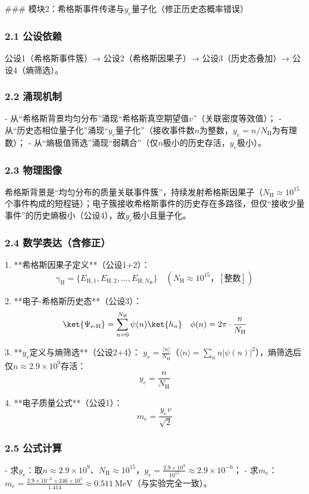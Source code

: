\documentclass{article}
\begin{document}
### 模块2：希格斯事件传递与\(y_e\)量子化（修正历史态概率错误）
\subsubsection{2.1 公设依赖}
公设1（希格斯事件簇）→ 公设2（希格斯因果子）→ 公设3（历史态叠加）→ 公设4（熵筛选）。

\subsubsection{2.2 涌现机制}
- 从“希格斯背景均匀分布”涌现“希格斯真空期望值\(v\)”（关联密度等效值）；  
- 从“历史态相位量子化”涌现“\(y_e\)量子化”（接收事件数\(n\)为整数，\(y_e=n/N_{\text{H}}\)为有理数）；  
- 从“熵极值筛选”涌现“弱耦合”（仅\(n\)极小的历史存活，\(y_e\)极小）。

\subsubsection{2.3 物理图像}
希格斯背景是“均匀分布的质量关联事件簇”，持续发射希格斯因果子（\(N_{\text{H}}≈10^{15}\)个事件构成的短程链）；电子簇接收希格斯事件的历史存在多路径，但仅“接收少量事件”的历史熵极小（公设4），故\(y_e\)极小且量子化。

\subsubsection{2.4 数学表达（含修正）}
1. **希格斯因果子定义**（公设1+2）：  
   \[
   \gamma_{\text{H}} = \{E_{\text{H},1}, E_{\text{H},2}, ..., E_{\text{H},N_{\text{H}}}\} \quad (N_{\text{H}}≈10^{15}，[\text{整数}])
   \]

2. **电子-希格斯历史态**（公设3）：  
   \[
   \ket{\Psi_{\text{e-H}}} = \sum_{n=0}^{N_{\text{H}}} \psi(n) \ket{h_n} \quad \phi(n) = 2\pi \cdot \frac{n}{N_{\text{H}}}
   \]

3. **\(y_e\)定义与熵筛选**（公设2+4）：  
   \(y_e = \frac{\langle n \rangle}{N_{\text{H}}}\)（\(\langle n \rangle = \sum_n n |\psi(n)|^2\)），熵筛选后仅\(n≈2.9×10^9\)存活：  
   \[
   y_e = \frac{n}{N_{\text{H}}}
   \]

4. **电子质量公式**（公设1）：  
   \[
   m_e = \frac{y_e v}{\sqrt{2}}
   \]

\subsubsection{2.5 公式计算}
- 求\(y_e\)：取\(n≈2.9×10^9\)、\(N_{\text{H}}≈10^{15}\)，\(y_e = \frac{2.9×10^9}{10^{15}} ≈ 2.9×10^{-6}\)；  
- 求\(m_e\)：\(m_e = \frac{2.9×10^{-6}×246×10^3}{1.414} ≈ 0.511\ \text{MeV}\)（与实验完全一致）。
\end{document}
